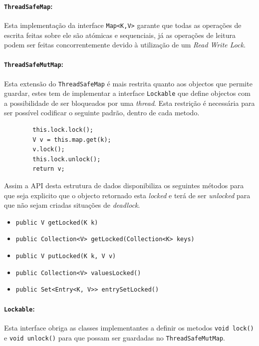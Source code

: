 \documentclass[a4paper]{article}
\begin{document}
\paragraph{\texttt{ThreadSafeMap}:}

Esta implementação da interface \texttt{Map<K,V>} garante que todas as operações de escrita feitas sobre ele são atómicas e sequenciais, já as operações de leitura podem ser feitas concorrentemente devido à utilização de um \textit{Read Write Lock}.

\paragraph{\texttt{ThreadSafeMutMap}:}

Esta extensão do \texttt{ThreadSafeMap} é mais restrita quanto aos objectos que permite guardar, estes tem de implementar a interface \texttt{Lockable} que define objectos com a possibilidade de ser bloqueados por uma \textit{thread}. Esta restrição é necessária para ser possível codificar o seguinte padrão, dentro de cada metodo.

    \begin{verbatim}
        this.lock.lock();
        V v = this.map.get(k);
        v.lock();
        this.lock.unlock();
        return v;
    \end{verbatim}

Assim a API desta estrutura de dados disponibiliza os seguintes métodos para que seja explicito que o objecto retornado esta \textit{locked} e terá de ser \textit{unlocked} para que não sejam criadas situações de \textit{deadlock}.

\begin{itemize}
    \item \texttt{public V getLocked(K k)}
    \item \texttt{public Collection<V> getLocked(Collection<K> keys)}
    \item \texttt{public V putLocked(K k, V v)}
    \item \texttt{public Collection<V> valuesLocked()}
    \item \texttt{public Set<Entry<K, V>> entrySetLocked()}
\end{itemize}

\paragraph{\texttt{Lockable}:}

Esta interface obriga as classes implementantes a definir os metodos \texttt{void lock()} e \texttt{void unlock()} para que possam ser guardadas no \texttt{ThreadSafeMutMap}.
\end{document}
